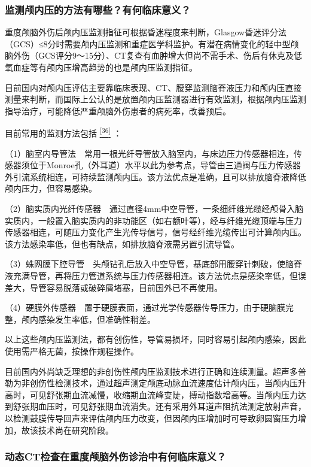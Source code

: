 \subsubsection{监测颅内压的方法有哪些？有何临床意义？}

重度颅脑外伤后颅内压监测指征可根据昏迷程度来判断，Glasgow昏迷评分法（GCS）≤8分时需要颅内压监测和重症医学科监护。有潜在病情变化的轻中型颅脑外伤（GCS评分9～15分）、CT复查有血肿增大但尚不需手术、伤后有休克及低氧血症等有颅内压增高趋势的也是颅内压监测指征。

目前国内对颅内压评估主要靠临床表现、CT、腰穿监测脑脊液压力和颅内压直接测量来判断，而国际上公认的是放置颅内压监测器进行有效监测，根据颅内压监测指导治疗，可能降低严重颅脑外伤患者的病死率，改善预后。

目前常用的监测方法包括
\protect\hyperlink{text00024.htmlux5cux23ch36-23}{\textsuperscript{{[}36{]}}}
：

（1）脑室内导管法　常用一根光纤导管放入脑室内，与床边压力传感器相连，传感器须位于Monroe孔（外耳道）水平以此为参考点，导管由三通阀与压力传感器外引流系统相连，可持续监测颅内压。该方法优点是准确，且可以排放脑脊液降低颅内压力，但容易感染。

（2）脑实质内光纤传感器　通过直径4mm中空导管，一条细纤维光缆经颅骨入脑实质内，一般置入脑实质内的非功能区（如右额叶等），经与纤维光缆顶端与压力传感器相连，可随压力变化产生光传导信号，信号经纤维光缆传出可计算颅内压。该方法感染率低，但也有缺点，如排放脑脊液需另置引流导管。

（3）蛛网膜下腔导管　头颅钻孔后放入中空导管，基底部用腰穿针刺破，使脑脊液充满导管，再将压力管道系统与压力传感器相连。该方法优点是感染率低，但误差大，导管容易脱落或破碎屑堵塞，目前国外已不再使用。

（4）硬膜外传感器　置于硬膜表面，通过光学传感器传导压力，由于硬脑膜完整，颅内感染发生率低，但准确性稍差。

以上这些颅内压监测法，都有创伤性，导管易损坏，同时容易引起颅内感染，因此使用需严格无菌，按操作规程操作。

目前国内外尚缺乏理想的非创伤性颅内压监测技术进行正确和连续测量。超声多普勒为非创伤性检测技术，通过超声测定颅底动脉血流速度估计颅内压，当颅内压升高时，可见舒张期血流减慢，收缩期血流峰变陡，搏动指数增高等。当颅内压力达到舒张期血压时，可见舒张期血流消失。还有采用外耳道声阻抗法测定放射声音，以检测鼓膜传导回声来评估颅内压力改变，但因颅内压增加时可导致卵圆窗压力增加，故该技术尚在研究阶段。

\subsubsection{动态CT检查在重度颅脑外伤诊治中有何临床意义？}

